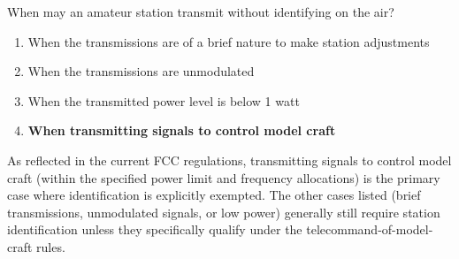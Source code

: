 \begin{tcolorbox}[colback=gray!10!white,colframe=black!75!black,title={T1D11}]
    When may an amateur station transmit without identifying on the air?
    \begin{enumerate}[label=\Alph*),noitemsep]
        \item When the transmissions are of a brief nature to make station adjustments
        \item When the transmissions are unmodulated
        \item When the transmitted power level is below 1 watt
        \item \textbf{When transmitting signals to control model craft}
    \end{enumerate}
\end{tcolorbox}

As reflected in the current FCC regulations, transmitting signals to control model craft (within the specified power limit and frequency allocations) is the primary case where identification is explicitly exempted. The other cases listed (brief transmissions, unmodulated signals, or low power) generally still require station identification unless they specifically qualify under the telecommand-of-model-craft rules.
